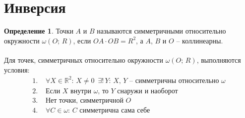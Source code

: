 \documentclass[12pt]{article}
\theoremstyle{definition}
\newtheorem{definition}{Определение}
\newcommand{\R}{\mathbb{R}}
\begin{document}
    \section{Инверсия}
    \begin{definition}
        Точки $A$ и $B$ называются симметричными относительно окружности $\omega(O;\,R)$, если $OA\cdot OB=R^2$, а $A$, $B$ и $O$ -- коллинеарны.\\\\
        Для точек, симметричных относительно окружности $\omega(O;\,R)$, выполняются условия:
        \begin{align*}
            1.\,\,&\forall X\in \R^2:\,X\neq0\,\,\,\exists!\,Y:\,X,\,Y \text{ -- симметричны относительно } \omega\\
            2.\,\,&\text{Если } X \text{ внутри } \omega\text{, то } Y \text{ снаружи и наоборот}\\
            3.\,\,&\text{Нет точки, симметричной } O\\
            4.\,\,&\forall C \in \omega:\,C \text{ симметрична сама себе}
        \end{align*}
    \end{definition}
\end{document}
